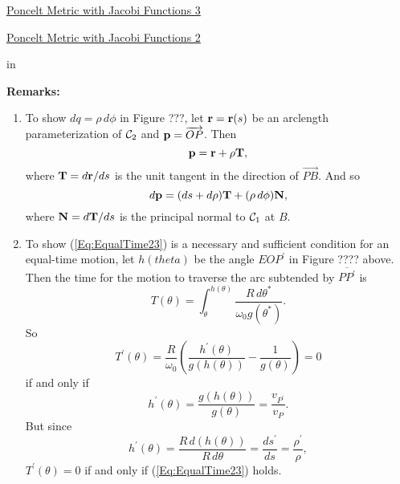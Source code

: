 \documentclass{ximera}
\newcommand{\pskip}{\vskip 0.1 in}
\begin{document}
\begin{exploration}
\begin{onlineOnly}
    \begin{center}
\end{center}
\end{onlineOnly}

\href{https://www.desmos.com/calculator/l7oadgwyva}{Poncelt Metric with Jacobi Functions 3} %
\end{exploration}


\begin{exploration}
\begin{onlineOnly}
    \begin{center}
\end{center}
\end{onlineOnly}

\href{https://www.desmos.com/calculator/hm5zop04ob}{Poncelt Metric with Jacobi Functions 2}
\end{exploration}

\pskip

{\bf Remarks:}
\begin{enumerate}
\item To show $dq = \rho \, d\phi$ in Figure ???, let ${\bf r} = {\bf r}(s)$ be an arclength parameterization of ${\cal C}_2$ and ${\bf p} = \overrightarrow{OP}$. Then 
\[
  {\bf p} = {\bf r} + \rho {\bf T} ,
\]
where ${\bf T} = d{\bf r}/ds$ is the unit tangent in the direction of $\overrightarrow{PB}$. And so
\[
  d  {\bf p} = (ds + d\rho){\bf T} + (\rho \, d\phi) {\bf N} , 
\]
where ${\bf N} = d{\bf T}/ds$ is the principal normal to ${\cal C}_1$ at $B$.

\item To show (\ref{Eq:EqualTime23}) is a necessary and sufficient condition for an equal-time motion, let $h(theta)$ be the angle $EOP^\prime$ in Figure ???? above. Then the time for the motion to traverse the arc subtended by $\overline{PP^\prime}$ is
\[
   T(\theta) =  \int_\theta^{h(\theta)} \frac{R\, d\theta^*}{\omega_0 g(\theta^*)}.
\]
So
\[
     T^\prime(\theta) =\frac{R}{\omega_0}\left(   \frac{h^\prime(\theta)}{g(h(\theta))} - \frac{1}{g(\theta)}        \right) = 0
\]
if and only if
\[
    h^\prime(\theta) = \frac{g(h(\theta))}{g(\theta)} = \frac{v_{P^\prime}}{v_P}.
\]
But since 
\[
    h^\prime(\theta) =  \frac{R\,  d(h(\theta))}{R\, d\theta} =  \frac{ds^\prime}{ds} =  \frac{\rho^\prime}{\rho} , %
\]
$T^\prime(\theta)=0$ if and only if (\ref{Eq:EqualTime23}) holds.
\end{enumerate} 
\end{document}
